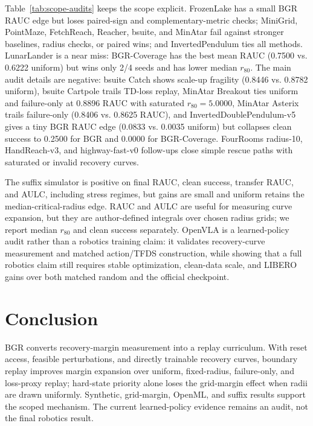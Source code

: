 \documentclass[letterpaper]{article}
\begin{document}
Table~\ref{tab:scope-audits} keeps the scope explicit. FrozenLake has a small BGR RAUC edge but loses paired-sign and complementary-metric checks; MiniGrid, PointMaze, FetchReach, Reacher, bsuite, and MinAtar fail against stronger baselines, radius checks, or paired wins; and InvertedPendulum ties all methods. LunarLander is a near miss: BGR-Coverage has the best mean RAUC (0.7500 vs. 0.6222 uniform) but wins only 2/4 seeds and has lower median $r_{80}$. The main audit details are negative: bsuite Catch shows scale-up fragility (0.8446 vs. 0.8782 uniform), bsuite Cartpole trails TD-loss replay, MinAtar Breakout ties uniform and failure-only at 0.8896 RAUC with saturated $r_{80}=5.0000$, MinAtar Asterix trails failure-only (0.8406 vs. 0.8625 RAUC), and InvertedDoublePendulum-v5 gives a tiny BGR RAUC edge (0.0833 vs. 0.0035 uniform) but collapses clean success to 0.2500 for BGR and 0.0000 for BGR-Coverage. FourRooms radius-10, HandReach-v3, and highway-fast-v0 follow-ups close simple rescue paths with saturated or invalid recovery curves.

The suffix simulator is positive on final RAUC, clean success, transfer RAUC, and AULC, including stress regimes, but gains are small and uniform retains the median-critical-radius edge. RAUC and AULC are useful for measuring curve expansion, but they are author-defined integrals over chosen radius grids; we report median $r_{80}$ and clean success separately. OpenVLA is a learned-policy audit rather than a robotics training claim: it validates recovery-curve measurement and matched action/TFDS construction, while showing that a full robotics claim still requires stable optimization, clean-data scale, and LIBERO gains over both matched random and the official checkpoint.

\section{Conclusion}

BGR converts recovery-margin measurement into a replay curriculum. With reset access, feasible perturbations, and directly trainable recovery curves, boundary replay improves margin expansion over uniform, fixed-radius, failure-only, and loss-proxy replay; hard-state priority alone loses the grid-margin effect when radii are drawn uniformly. Synthetic, grid-margin, OpenML, and suffix results support the scoped mechanism. The current learned-policy evidence remains an audit, not the final robotics result.

\begingroup
\renewcommand{\bibfont}{\scriptsize}
\setlength{\bibsep}{0pt}

\endgroup

\onecolumn
\begingroup
\scriptsize

\endgroup
\end{document}
